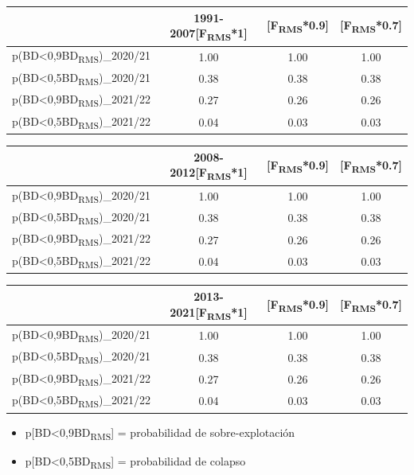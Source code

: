 \documentclass[
  spanish,
]{article}
\providecommand{\tightlist}{%
  \setlength{\itemsep}{0pt}\setlength{\parskip}{0pt}}
\begin{document}
\begin{longtable}[]{@{}lccc@{}}
\toprule
& 1991-2007{[}F\textsubscript{RMS}*1{]} & {[}F\textsubscript{RMS}*0.9{]}
& {[}F\textsubscript{RMS}*0.7{]}\tabularnewline
\midrule
\endhead
p(BD\textless0,9BD\textsubscript{RMS})\_2020/21 & 1.00 & 1.00 &
1.00\tabularnewline
p(BD\textless0,5BD\textsubscript{RMS})\_2020/21 & 0.38 & 0.38 &
0.38\tabularnewline
p(BD\textless0,9BD\textsubscript{RMS})\_2021/22 & 0.27 & 0.26 &
0.26\tabularnewline
p(BD\textless0,5BD\textsubscript{RMS})\_2021/22 & 0.04 & 0.03 &
0.03\tabularnewline
\bottomrule
\end{longtable}

\vspace{-0.7cm}

\begin{longtable}[]{@{}lccc@{}}
\toprule
& 2008-2012{[}F\textsubscript{RMS}*1{]} & {[}F\textsubscript{RMS}*0.9{]}
& {[}F\textsubscript{RMS}*0.7{]}\tabularnewline
\midrule
\endhead
p(BD\textless0,9BD\textsubscript{RMS})\_2020/21 & 1.00 & 1.00 &
1.00\tabularnewline
p(BD\textless0,5BD\textsubscript{RMS})\_2020/21 & 0.38 & 0.38 &
0.38\tabularnewline
p(BD\textless0,9BD\textsubscript{RMS})\_2021/22 & 0.27 & 0.26 &
0.26\tabularnewline
p(BD\textless0,5BD\textsubscript{RMS})\_2021/22 & 0.04 & 0.03 &
0.03\tabularnewline
\bottomrule
\end{longtable}

\vspace{-0.7cm}

\begin{longtable}[]{@{}lccc@{}}
\toprule
& 2013-2021{[}F\textsubscript{RMS}*1{]} & {[}F\textsubscript{RMS}*0.9{]}
& {[}F\textsubscript{RMS}*0.7{]}\tabularnewline
\midrule
\endhead
p(BD\textless0,9BD\textsubscript{RMS})\_2020/21 & 1.00 & 1.00 &
1.00\tabularnewline
p(BD\textless0,5BD\textsubscript{RMS})\_2020/21 & 0.38 & 0.38 &
0.38\tabularnewline
p(BD\textless0,9BD\textsubscript{RMS})\_2021/22 & 0.27 & 0.26 &
0.26\tabularnewline
p(BD\textless0,5BD\textsubscript{RMS})\_2021/22 & 0.04 & 0.03 &
0.03\tabularnewline
\bottomrule
\end{longtable}

\vspace{-0.7cm}
\scriptsize

\begin{itemize}
\tightlist
\item
  p{[}BD\textless0,9BD\textsubscript{RMS}{]} = probabilidad de
  sobre-explotación
\item
  p{[}BD\textless0,5BD\textsubscript{RMS}{]} = probabilidad de colapso
\end{itemize}
\end{document}
